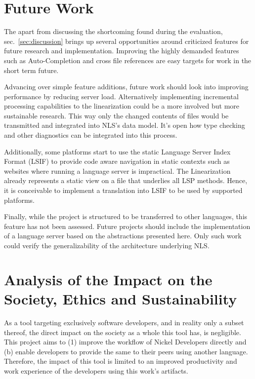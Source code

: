 \documentclass[
  a4paper,
  bibtex,
  english,
  nomenclature]{kthlatex/kththesis/kththesis}
\begin{document}
\hypertarget{sec:future-work}{%
\section{Future Work}\label{sec:future-work}}

The apart from discussing the shortcoming found during the evaluation,
sec.~\ref{sec:discussion} brings up several opportunities around
criticized features for future research and implementation. Improving
the highly demanded features such as Auto-Completion and cross file
references are easy targets for work in the short term future.

Advancing over simple feature additions, future work should look into
improving performance by reducing server load. Alternatively
implementing incremental processing capabilities to the linearization
could be a more involved but more sustainable research. This way only
the changed contents of files would be transmitted and integrated into
NLS's data model. It's open how type checking and other diagnostics can
be integrated into this process.

Additionally, some platforms start to use the static Language Server
Index Format (LSIF) to provide code aware navigation in static contexts
such as websites where running a language server is impractical. The
Linearization already represents a static view on a file that underlies
all LSP methods. Hence, it is conceivable to implement a translation
into LSIF to be used by supported platforms.

Finally, while the project is structured to be transferred to other
languages, this feature has not been assessed. Future projects should
include the implementation of a language server based on the
abstractions presented here. Only such work could verify the
generalizability of the architecture underlying NLS.

\hypertarget{sec:analysis-of-the-impact-on-the-society-ethics-and-sustainability}{%
\section{Analysis of the Impact on the Society, Ethics and
Sustainability}\label{sec:analysis-of-the-impact-on-the-society-ethics-and-sustainability}}

As a tool targeting exclusively software developers, and in reality only
a subset thereof, the direct impact on the society as a whole this tool
has, is negligible. This project aims to (1) improve the workflow of
Nickel Developers directly and (b) enable developers to provide the same
to their peers using another language. Therefore, the impact of this
tool is limited to an improved productivity and work experience of the
developers using this work's artifacts.
\end{document}
